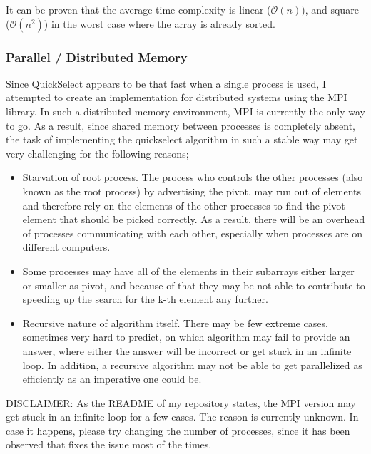 \documentclass[11pt]{article}
\begin{document}
It can be proven that the average time complexity is linear (\(\mathcal{O}(n)\)), and square (\(\mathcal{O}(n^{2})\)) in the worst case where the array is already sorted.
\subsubsection{Parallel / Distributed Memory}
\label{sec:org9c77196}
Since QuickSelect appears to be that fast when a single process is used, I attempted to create an implementation for distributed systems using the MPI library. In such a distributed memory environment, MPI is currently the only way to go. As a result, since shared memory between processes is completely absent, the task of implementing the quickselect algorithm in such a stable way may get very challenging for the following reasons;
\begin{itemize}
\item Starvation of root process. The process who controls the other processes (also known as the root process) by advertising the pivot, may run out of elements and therefore rely on the elements of the other processes to find the pivot element that should be picked correctly. As a result, there will be an overhead of processes communicating with each other, especially when processes are on different computers.
\item Some processes may have all of the elements in their subarrays either larger or smaller as pivot, and because of that they may be not able to contribute to speeding up the search for the k-th element any further.
\item Recursive nature of algorithm itself. There may be few extreme cases, sometimes very hard to predict, on which algorithm may fail to provide an answer, where either the answer will be incorrect or get stuck in an infinite loop. In addition, a recursive algorithm may not be able to get parallelized as efficiently as an imperative one could be.
\end{itemize}
\uline{DISCLAIMER:} As the README of my repository states, the MPI version may get stuck in an infinite loop for a few cases. The reason is currently unknown. In case it happens, please try changing the number of processes, since it has been observed that fixes the issue most of the times.
\end{document}
